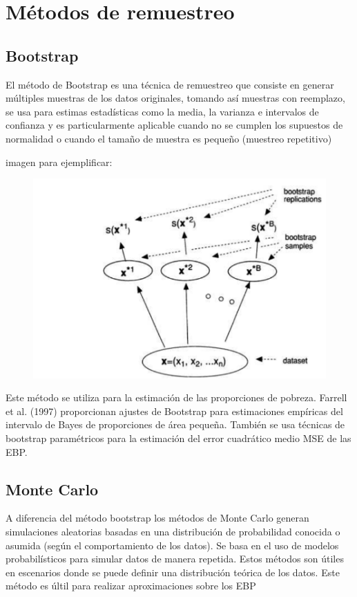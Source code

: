 \documentclass[12pt,spanish]{article}
\begin{document}
\section*{Métodos de remuestreo}

\subsection*{Bootstrap}
El método de Bootstrap es una técnica de remuestreo que consiste en generar múltiples muestras de los datos originales, tomando así muestras con reemplazo, se usa para estimas estadísticas como la media, la varianza e intervalos de confianza  y es particularmente aplicable cuando no se cumplen los supuestos de normalidad o cuando el tamaño de muestra es pequeño (muestreo repetitivo) 

imagen para ejemplificar:
\begin{figure}[H]
    \centering
    \includegraphics[width=0.5\linewidth]{ejemplo boots.png}
    \caption{}
    \label{fig:enter-label}
\end{figure}

Este método se utiliza para la estimación de las proporciones de pobreza. Farrell et al. (1997) proporcionan ajustes de Bootstrap para estimaciones empíricas del intervalo de Bayes de proporciones de área pequeña. También se usa técnicas de bootstrap paramétricos para la estimación del error cuadrático medio MSE de las EBP.

\subsection*{Monte Carlo}
A diferencia del método bootstrap los métodos de Monte Carlo generan simulaciones aleatorias basadas en una distribución de probabilidad conocida o asumida (según el comportamiento de los datos). Se basa en el uso de modelos probabilísticos para simular datos de manera repetida. Estos métodos son útiles en escenarios donde se puede definir una distribución teórica de los datos. Este método es últil para realizar aproximaciones sobre los EBP
\end{document}
